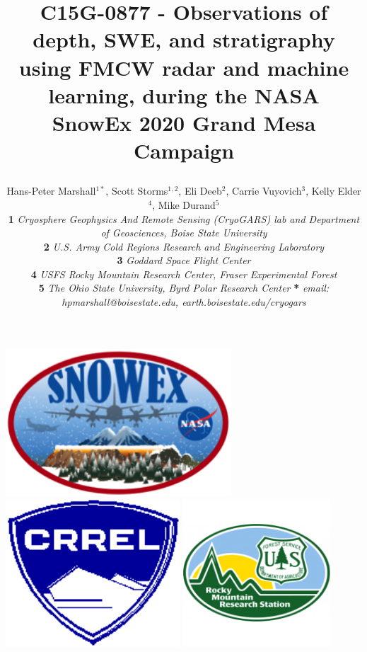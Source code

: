 \documentclass[landscape,a0b,final]{a0poster}
\title{\begin{center} C15G-0877 - Observations of depth, SWE, and stratigraphy using FMCW radar and machine learning, during the NASA SnowEx 2020 Grand Mesa Campaign \end{center} }
\author{ \LARGE{Hans-Peter Marshall$^{1*}$, Scott Storms$^{1,2}$, Eli Deeb$^2$, Carrie Vuyovich$^3$, Kelly Elder$^4$, Mike Durand$^5$} \\ %
\textbf{1} \textit{Cryosphere Geophysics And Remote Sensing (CryoGARS) lab and Department of Geosciences, Boise State University} \\
\textbf{2} \textit{U.S. Army Cold Regions Research and Engineering Laboratory} \\
\textbf{3} \textit{Goddard Space Flight Center} \\
\textbf{4} \textit{USFS Rocky Mountain Research Center, Fraser Experimental Forest} \\
\textbf{5} \textit{The Ohio State University, Byrd Polar Research Center}
\textbf{*} \textit{email: hpmarshall@boisestate.edu, earth.boisestate.edu/cryogars}}
\begin{document}

\colorbox{boxcol}{		%
\begin{minipage}[c]{0.80\textwidth}	%
\maketitle
\end{minipage}

\begin{minipage}[c]{0.20\textwidth}
\begin{flushright}
\includegraphics[height=5.5cm]{SnowExLogo.png} \vspace{0.2cm}
\includegraphics[height=5.5cm]{CRRELlogo.png} \hspace{0.2cm} \includegraphics[height=5.5cm]{USFS_RMRS_logo.png} \hspace{0.2cm} \\

\end{flushright}
\end{minipage}}
\end{document}
